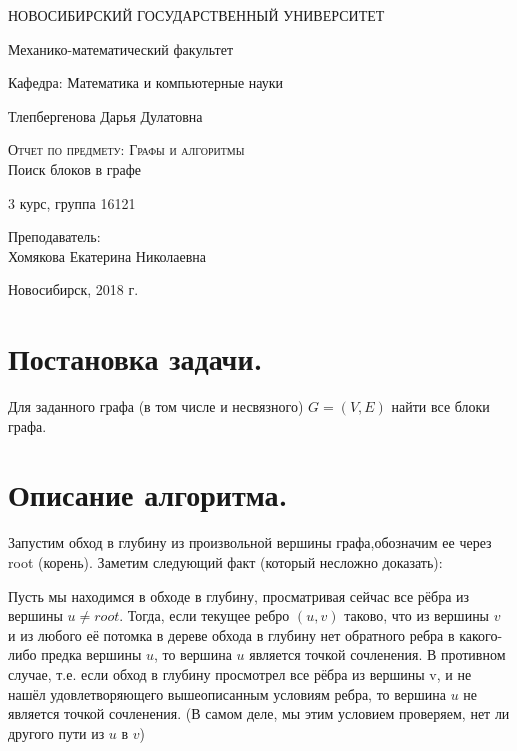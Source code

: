 \documentclass[12pt,a4paper]{scrartcl}
\begin{document}
\begin{titlepage}
  \begin{center}
     
    \vspace{0.5cm}
 
    НОВОСИБИРСКИЙ ГОСУДАРСТВЕННЫЙ УНИВЕРСИТЕТ
    \vspace{0.25cm}
     
    Механико-математический факультет
     
    Кафедра: Математика и компьютерные науки
    \vfill
     
     
    Тлепбергенова Дарья Дулатовна
    \vfill
 
    \textsc{Отчет по предмету: Графы и алгоритмы}\\[5mm]
     
    {\LARGE Поиск блоков в графе }
  \bigskip
     
    3 курс, группа 16121
\end{center}
\vfill
 \newlength{\ML}
\hfill\begin{minipage}{0.4\textwidth}
  Преподаватель:\\
  Хомякова Екатерина Николаевна
\end{minipage}%
\bigskip

 \vfill
\begin{center}
  Новосибирск, 2018 г.
\end{center}
\end{titlepage}

\newpage
\section{Постановка задачи.}
Для заданного графа (в том числе и несвязного) $G=(V,E)$ найти все блоки графа.
\section{Описание алгоритма.}
Запустим обход в глубину из произвольной вершины графа,обозначим ее через root (корень). Заметим следующий факт (который несложно доказать):

Пусть мы находимся в обходе в глубину, просматривая сейчас все рёбра из вершины $u \neq root$. Тогда, если текущее ребро $(u,v)$ таково, что из вершины $v$ и из любого её потомка в дереве обхода в глубину нет обратного ребра в какого-либо предка вершины $u$, то вершина $u$ является точкой сочленения. В противном случае, т.е. если обход в глубину просмотрел все рёбра из вершины v, и не нашёл удовлетворяющего вышеописанным условиям ребра, то вершина $u$ не является точкой сочленения. (В самом деле, мы этим условием проверяем, нет ли другого пути из $u$ в $v$)
\end{document}
